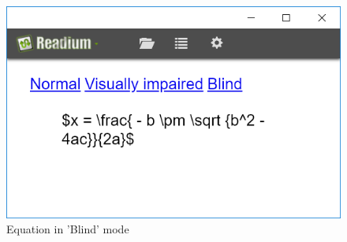 \begin{figure}[H]
	\centering
	\includegraphics[width=\linewidth*2/3]{figures/EquationBl.PNG}
	\caption{Equation in 'Blind' mode}
	\label{fig:equation_blind}
\end{figure}




